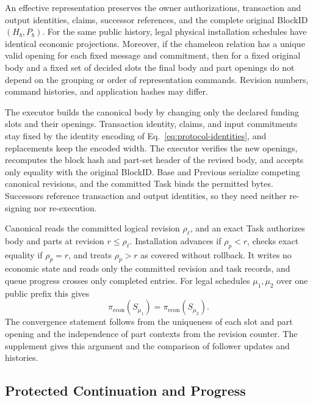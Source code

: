 \begin{lemma}
\label{lem:security-installation}
An effective representation preserves the owner authorizations,
transaction and output identities, claims, successor references, and the
complete original BlockID $(H_b,P_b)$. For the same public history, legal
physical installation schedules have identical economic projections.
Moreover, if the chameleon relation has a unique valid opening for each
fixed message and commitment, then for a fixed original body and a fixed
set of decided slots the final body and part openings do not depend on
the grouping or order of representation commands. Revision numbers,
command histories, and application hashes may differ.
\end{lemma}
\begin{IEEEproof}
The executor builds the canonical body by changing only the declared funding slots and their openings. Transaction identity, claims, and input commitments stay fixed by the identity encoding of Eq.~\eqref{eq:protocol-identities}, and replacements keep the encoded width. The executor verifies the new openings, recomputes the block hash and part-set header of the revised body, and accepts only equality with the original BlockID. Base and Previous serialize competing canonical revisions, and the committed Task binds the permitted bytes. Successors reference transaction and output identities, so they need neither re-signing nor re-execution.

Canonical reads the committed logical revision $\rho_\ell$, and an exact Task authorizes body and parts at revision $r\le\rho_\ell$. Installation advances if $\rho_p<r$, checks exact equality if $\rho_p=r$, and treats $\rho_p>r$ as covered without rollback. It writes no economic state and reads only the committed revision and task records, and queue progress crosses only completed entries. For legal schedules $\mu_1,\mu_2$ over one public prefix this gives
\begin{equation}
 \pi_{\mathrm{econ}}(S_{\mu_1})=\pi_{\mathrm{econ}}(S_{\mu_2}).
 \label{eq:security-installation}
\end{equation}
The convergence statement follows from the uniqueness of each slot and part opening and the independence of part contexts from the revision counter. The supplement gives this argument and the comparison of follower updates and histories.
\end{IEEEproof}

\subsection{Protected Continuation and Progress}
\label{sec:security-composition}

